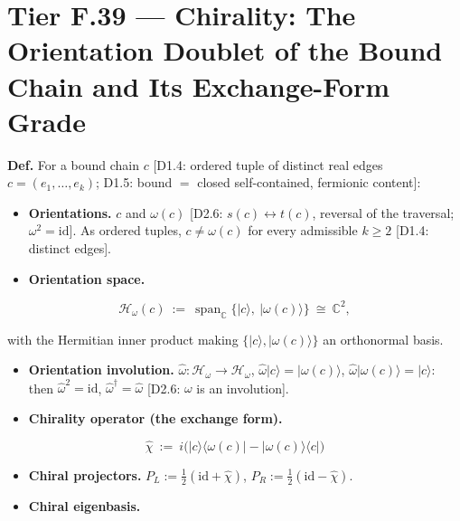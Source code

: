 \section[Tier F.39 — Chirality: The Orientation Doublet of the Bound…]{\texorpdfstring{Tier F.39 — Chirality: The Orientation Doublet of the Bound Chain and Its Exchange-Form Grade}{Tier F.39 - Chirality: The Orientation Doublet of the Bound Chain and Its Exchange-Form Grade}}

\begin{definition}\label{tag:Def-H-33}
\textbf{Def.} For a bound chain $c$ [D1.4: ordered tuple of distinct real edges $c=(e_1,\dots,e_k)$; D1.5: bound $=$ closed self-contained, fermionic content]:

\begin{itemize}
\item \textbf{Orientations.} $c$ and $\omega(c)$ [D2.6: $s(c)\leftrightarrow t(c)$, reversal of the traversal; $\omega^2=\mathrm{id}$]. As ordered tuples, $c\ne\omega(c)$ for every admissible $k\ge2$ [D1.4: distinct edges].
\item \textbf{Orientation space.}
\end{itemize}

\[
\mathcal H_\omega(c)\ :=\ \operatorname{span}_{\mathbb C}\bigl\{|c\rangle,\ |\omega(c)\rangle\bigr\}\ \cong\ \mathbb C^2,
\]

with the Hermitian inner product making $\{|c\rangle,|\omega(c)\rangle\}$ an orthonormal basis.

\begin{itemize}
\item \textbf{Orientation involution.} $\hat\omega:\mathcal H_\omega\to\mathcal H_\omega$, $\hat\omega|c\rangle=|\omega(c)\rangle$, $\hat\omega|\omega(c)\rangle=|c\rangle$: then $\hat\omega^2=\mathrm{id}$, $\hat\omega^\dagger=\hat\omega$ [D2.6: $\omega$ is an involution].
\item \textbf{Chirality operator (the exchange form).}
\end{itemize}

\[
\boxed{\ \hat\chi\ :=\ i\bigl(|c\rangle\langle\omega(c)|-|\omega(c)\rangle\langle c|\bigr)\ }
\]

\begin{itemize}
\item \textbf{Chiral projectors.} $P_L:=\tfrac12(\mathrm{id}+\hat\chi)$, $P_R:=\tfrac12(\mathrm{id}-\hat\chi)$.
\item \textbf{Chiral eigenbasis.}
\end{itemize}


\end{definition}
